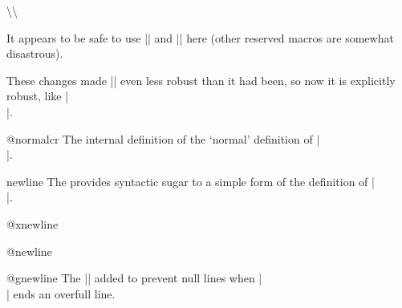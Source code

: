 %
%

\textbackslash\textbackslash

 It appears to be safe to use |\reserved@e| and |\reserved@f| here
 (other reserved macros are somewhat disastrous).

 These changes made |\newline| even less robust than it had been,
 so now it is explicitly robust, like |\\|.

\begin{docCommand}{@normalcr}{}
 The internal definition of the `normal' definition of |\\|.
\begin{teX}
\DeclareRobustCommand\\{%
  \let \reserved@e \relax
  \let \reserved@f \relax
  \@ifstar{\let \reserved@e \vadjust \let \reserved@f \nobreak
             \@xnewline}%
          \@xnewline}
\expandafter\let\expandafter\@normalcr
     \csname\expandafter\@gobble\string\\ \endcsname
\end{teX}
  
  \end{docCommand}
  

%
%
\begin{docCommand}{newline}{}
 The  provides syntactic sugar to a simple form of the  definition of |\\|.

    \begin{teX}
\DeclareRobustCommand\newline{\@normalcr\relax}
    \end{teX}
  \end{docCommand}
 


  \begin{docCommand}{@xnewline}{}
    \begin{teX}
\def\@xnewline{\@ifnextchar[%
                  \@newline
                 {\@gnewline\relax}}
    \end{teX}
  \end{docCommand}

  \begin{docCommand}{@newline}{}
    \begin{teX}
\def\@newline[#1]{\let \reserved@e \vadjust
                   \@gnewline {\vskip #1}}
    \end{teX}
  \end{docCommand}
%
  \begin{docCommand}{@gnewline}{ }
 The |\nobreak| added to prevent null lines when |\\|
 ends an overfull line.  

    \begin{teX}
\def\@gnewline #1{%
  \ifvmode
    \@nolnerr
  \else 
    \unskip \reserved@e {\reserved@f#1}\nobreak \hfil \break
  \fi}
    \end{teX}
  \end{docCommand}

